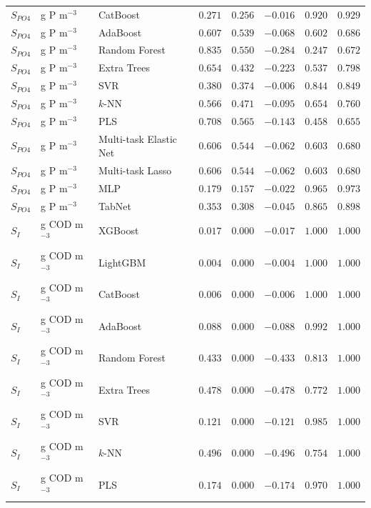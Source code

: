 \begin{longtable}{llp{3.1cm}rrrrr}
$S_{PO4}$ & g P m$^{-3}$ & CatBoost & $0.271$ & $0.256$ & $-0.016$ & $0.920$ & $0.929$ \\
$S_{PO4}$ & g P m$^{-3}$ & AdaBoost & $0.607$ & $0.539$ & $-0.068$ & $0.602$ & $0.686$ \\
$S_{PO4}$ & g P m$^{-3}$ & Random Forest & $0.835$ & $0.550$ & $-0.284$ & $0.247$ & $0.672$ \\
$S_{PO4}$ & g P m$^{-3}$ & Extra Trees & $0.654$ & $0.432$ & $-0.223$ & $0.537$ & $0.798$ \\
$S_{PO4}$ & g P m$^{-3}$ & SVR & $0.380$ & $0.374$ & $-0.006$ & $0.844$ & $0.849$ \\
$S_{PO4}$ & g P m$^{-3}$ & $k$-NN & $0.566$ & $0.471$ & $-0.095$ & $0.654$ & $0.760$ \\
$S_{PO4}$ & g P m$^{-3}$ & PLS & $0.708$ & $0.565$ & $-0.143$ & $0.458$ & $0.655$ \\
$S_{PO4}$ & g P m$^{-3}$ & Multi-task Elastic Net & $0.606$ & $0.544$ & $-0.062$ & $0.603$ & $0.680$ \\
$S_{PO4}$ & g P m$^{-3}$ & Multi-task Lasso & $0.606$ & $0.544$ & $-0.062$ & $0.603$ & $0.680$ \\
$S_{PO4}$ & g P m$^{-3}$ & MLP & $0.179$ & $0.157$ & $-0.022$ & $0.965$ & $0.973$ \\
$S_{PO4}$ & g P m$^{-3}$ & TabNet & $0.353$ & $0.308$ & $-0.045$ & $0.865$ & $0.898$ \\
$S_{I}$ & g COD m$^{-3}$ & XGBoost & $0.017$ & $0.000$ & $-0.017$ & $1.000$ & $1.000$ \\
$S_{I}$ & g COD m$^{-3}$ & LightGBM & $0.004$ & $0.000$ & $-0.004$ & $1.000$ & $1.000$ \\
$S_{I}$ & g COD m$^{-3}$ & CatBoost & $0.006$ & $0.000$ & $-0.006$ & $1.000$ & $1.000$ \\
$S_{I}$ & g COD m$^{-3}$ & AdaBoost & $0.088$ & $0.000$ & $-0.088$ & $0.992$ & $1.000$ \\
$S_{I}$ & g COD m$^{-3}$ & Random Forest & $0.433$ & $0.000$ & $-0.433$ & $0.813$ & $1.000$ \\
$S_{I}$ & g COD m$^{-3}$ & Extra Trees & $0.478$ & $0.000$ & $-0.478$ & $0.772$ & $1.000$ \\
$S_{I}$ & g COD m$^{-3}$ & SVR & $0.121$ & $0.000$ & $-0.121$ & $0.985$ & $1.000$ \\
$S_{I}$ & g COD m$^{-3}$ & $k$-NN & $0.496$ & $0.000$ & $-0.496$ & $0.754$ & $1.000$ \\
$S_{I}$ & g COD m$^{-3}$ & PLS & $0.174$ & $0.000$ & $-0.174$ & $0.970$ & $1.000$ \\

\end{longtable}
